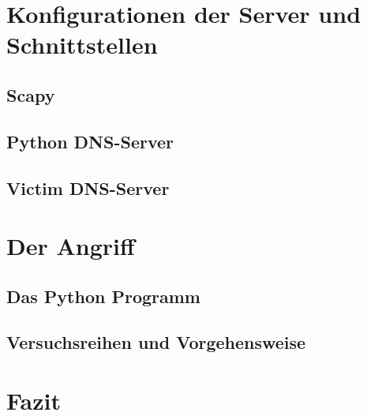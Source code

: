 \documentclass[10pt,a4paper]{article}
\begin{document}
\section{Konfigurationen der Server und Schnittstellen}
\subsection{Scapy}
\subsection{Python DNS-Server}
\subsection{Victim DNS-Server}

\section{Der Angriff}
\subsection{Das Python Programm}
\subsection{Versuchsreihen und Vorgehensweise}

\section{Fazit}
\end{document}
